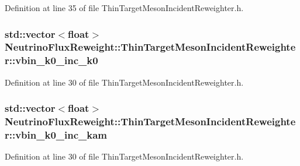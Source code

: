 Definition at line 35 of file Thin\-Target\-Meson\-Incident\-Reweighter.\-h.

\hypertarget{class_neutrino_flux_reweight_1_1_thin_target_meson_incident_reweighter_a965f246458feafcee2f9931b2678efd8}{
\subsubsection[{vbin\-\_\-k0\-\_\-inc\-\_\-k0}]{\setlength{\rightskip}{0pt plus 5cm}std\-::vector$<$float$>$ Neutrino\-Flux\-Reweight\-::\-Thin\-Target\-Meson\-Incident\-Reweighter\-::vbin\-\_\-k0\-\_\-inc\-\_\-k0}}\label{class_neutrino_flux_reweight_1_1_thin_target_meson_incident_reweighter_a965f246458feafcee2f9931b2678efd8}


Definition at line 30 of file Thin\-Target\-Meson\-Incident\-Reweighter.\-h.

\hypertarget{class_neutrino_flux_reweight_1_1_thin_target_meson_incident_reweighter_ad783e52b4a6206cbb7276d4d168b4807}{
\subsubsection[{vbin\-\_\-k0\-\_\-inc\-\_\-kam}]{\setlength{\rightskip}{0pt plus 5cm}std\-::vector$<$float$>$ Neutrino\-Flux\-Reweight\-::\-Thin\-Target\-Meson\-Incident\-Reweighter\-::vbin\-\_\-k0\-\_\-inc\-\_\-kam}}\label{class_neutrino_flux_reweight_1_1_thin_target_meson_incident_reweighter_ad783e52b4a6206cbb7276d4d168b4807}


Definition at line 30 of file Thin\-Target\-Meson\-Incident\-Reweighter.\-h.

